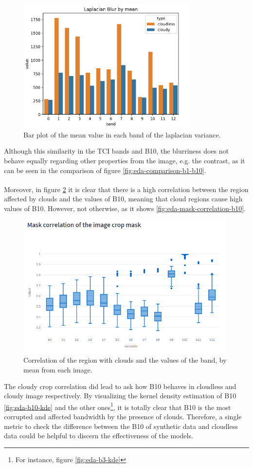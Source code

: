 \begin{figure}[H]
	\centering
	\includegraphics[width=9cm]{imgs/eda/laplacian-blur}
	\caption{Bar plot of the mean value in each band of the laplacian variance.}
	\label{fig:eda-laplacian-blur}
\end{figure}
Although this similarity in the TCI bands and B10, the blurriness does not behave equally regarding other properties from the image, e.g. the contrast, as it can be seen in the comparison of figure \ref{fig:eda-comparison-b1-b10}.
\\
\\
Moreover, in figure \ref{fig:eda-crop-correlation-b10} it is clear that there is a high correlation between the region affected by clouds and the values of B10, meaning that cloud regions cause high values of B10. However, not otherwise, as it shows \ref{fig:eda-mask-correlation-b10}.
\begin{figure}[H]
	\centering
	\includegraphics[width=11cm]{imgs/eda/crop-correlation}
	\caption{Correlation of the region with clouds and the values of the band, by mean from each image.}
	\label{fig:eda-crop-correlation-b10}
\end{figure}
The cloudy crop correlation did lead to ask how B10 behaves in cloudless and cloudy image respectively. By visualizing the kernel density estimation of B10 \ref{fig:eda-b10-kde} and the other ones\footnote{For instance, figure \ref{fig:eda-b3-kde}}, it is totally clear that B10 is the most corrupted and affected bandwidth by the presence of clouds. Therefore, a single metric to check the difference between the B10 of synthetic data and cloudless data could be helpful to discern the effectiveness of the models.
